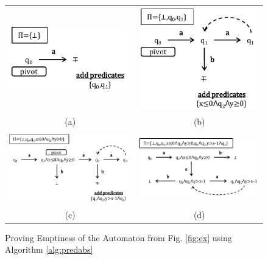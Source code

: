 \documentclass[10pt,conference,letterpaper,twocolumn]{IEEEtran}
\begin{document}
\begin{figure}[htb]
\begin{tabular}{cc}
\includegraphics[scale=0.52]{figures/PA1.pdf} & \includegraphics[scale=0.52]{figures/PA2.pdf} \\
\footnotesize{(a)} & \footnotesize{(b)} \\
\\
\includegraphics[scale=0.52]{figures/PA3.pdf} & \includegraphics[scale=0.52]{figures/PA4.pdf} \\
\footnotesize{(c)} & \footnotesize{(d)}
\end{tabular}
\caption{Proving Emptiness of the Automaton from Fig. \ref{fig:ex} using Algorithm \ref{alg:predabs}}
\label{fig:pa}
\end{figure}
\end{document}
